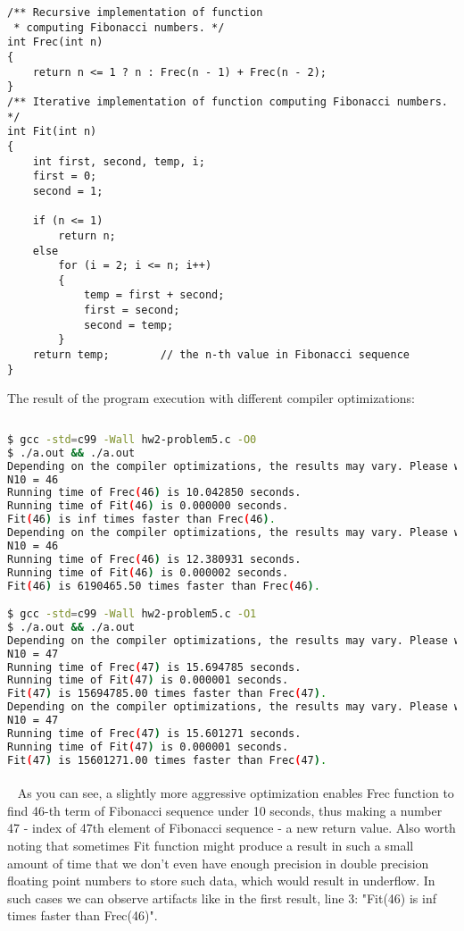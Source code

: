 \documentclass{article}
\begin{document}
\begin{verbatim}
/** Recursive implementation of function
 * computing Fibonacci numbers. */
int Frec(int n)
{
    return n <= 1 ? n : Frec(n - 1) + Frec(n - 2);
}
/** Iterative implementation of function computing Fibonacci numbers. */
int Fit(int n)
{
    int first, second, temp, i;
    first = 0;
    second = 1;

    if (n <= 1)
        return n;
    else
        for (i = 2; i <= n; i++)
        {
            temp = first + second;
            first = second;
            second = temp;
        }
    return temp;        // the n-th value in Fibonacci sequence
}
		\end{verbatim}
		
		
	\rmfamily
	\noindent The result of the program execution with different compiler optimizations:
	
	\ttfamily
	\begin{lstlisting}[language=bash]
	
$ gcc -std=c99 -Wall hw2-problem5.c -O0
$ ./a.out && ./a.out
Depending on the compiler optimizations, the results may vary. Please wait...
N10 = 46
Running time of Frec(46) is 10.042850 seconds.
Running time of Fit(46) is 0.000000 seconds.
Fit(46) is inf times faster than Frec(46).
Depending on the compiler optimizations, the results may vary. Please wait...
N10 = 46
Running time of Frec(46) is 12.380931 seconds.
Running time of Fit(46) is 0.000002 seconds.
Fit(46) is 6190465.50 times faster than Frec(46).

$ gcc -std=c99 -Wall hw2-problem5.c -O1
$ ./a.out && ./a.out
Depending on the compiler optimizations, the results may vary. Please wait...
N10 = 47
Running time of Frec(47) is 15.694785 seconds.
Running time of Fit(47) is 0.000001 seconds.
Fit(47) is 15694785.00 times faster than Frec(47).
Depending on the compiler optimizations, the results may vary. Please wait...
N10 = 47
Running time of Frec(47) is 15.601271 seconds.
Running time of Fit(47) is 0.000001 seconds.
Fit(47) is 15601271.00 times faster than Frec(47).
	\end{lstlisting}
	

	\paragraph{}\
	\rmfamily
	As you can see, a slightly more aggressive optimization enables Frec function to find 46-th term of Fibonacci sequence under 10 seconds, thus making a number 47 - index of 47th element of Fibonacci sequence - a new return value. Also worth noting that sometimes Fit function might produce a result in such a small amount of time that we don't even have enough precision in double precision floating point numbers to store such data, which would result in underflow. In such cases we can observe artifacts like in the first result, line 3: "Fit(46) is inf times faster than Frec(46)".
		
\end{document}
